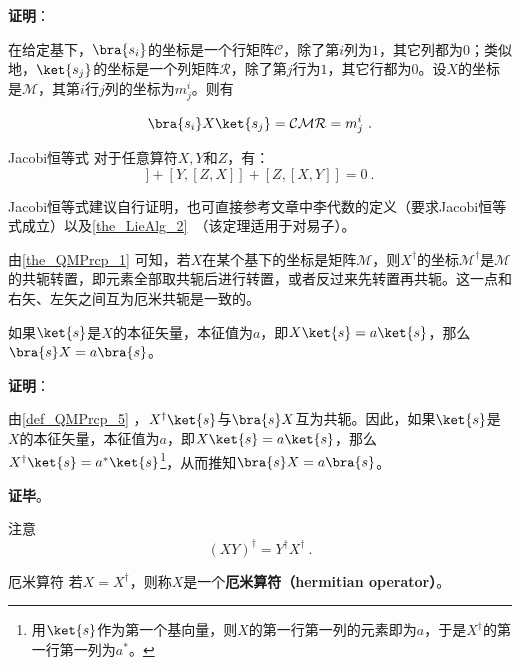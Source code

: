 \textbf{证明}：

在给定基下，$\bra{s_i}$的坐标是一个行矩阵$\mathcal{C}$，除了第$i$列为$1$，其它列都为$0$；类似地，$\ket{s_j}$的坐标是一个列矩阵$\mathcal{R}$，除了第$j$行为$1$，其它行都为$0$。设$X$的坐标是$\mathcal{M}$，其第$i$行$j$列的坐标为$m^i_j$。则有

\begin{equation}
\bra{s_i}X\ket{s_j} = \mathcal{CMR} = m^i_j~.
\end{equation}


\begin{theorem}{Jacobi恒等式}
对于任意算符$X, Y$和$Z$，有：
\begin{equation}
[X, [Y, Z]]+[Y, [Z, X]]+[Z, [X, Y]]=0~.
\end{equation}
\end{theorem}

Jacobi恒等式建议自行证明，也可直接参考文章中李代数的定义（要求Jacobi恒等式成立）以及\autoref{the_LieAlg_2}~（该定理适用于对易子）。


由\autoref{the_QMPrcp_1} 可知，若$X$在某个基下的坐标是矩阵$\mathcal{M}$，则$X^\dagger$的坐标$\mathcal{M}^\dagger$是$\mathcal{M}$的共轭转置，即元素全部取共轭后进行转置，或者反过来先转置再共轭。这一点和右矢、左矢之间互为厄米共轭是一致的。



\begin{lemma}{}\label{lem_QMPrcp_1}
如果$\ket{s}$是$X$的本征矢量，本征值为$a$，即$X\ket{s}=a\ket{s}$，那么$\bra{s}X=a\bra{s}$。
\end{lemma}

\textbf{证明}：

由\autoref{def_QMPrcp_5} ，$X^\dagger\ket{s}$与$\bra{s}X$互为共轭。因此，如果$\ket{s}$是$X$的本征矢量，本征值为$a$，即$X\ket{s}=a\ket{s}$，那么$X^\dagger\ket{s}=a^*\ket{s}$\footnote{用$\ket{s}$作为第一个基向量，则$X$的第一行第一列的元素即为$a$，于是$X^\dagger$的第一行第一列为$a^*$。}，从而推知$\bra{s}X=a\bra{s}$。

\textbf{证毕}。


注意
\begin{equation}
(XY)^\dagger = Y^\dagger X^\dagger~.
\end{equation}

\begin{definition}{厄米算符}\label{def_QMPrcp_12}
若$X=X^\dagger$，则称$X$是一个\textbf{厄米算符（hermitian operator）}。
\end{definition}

